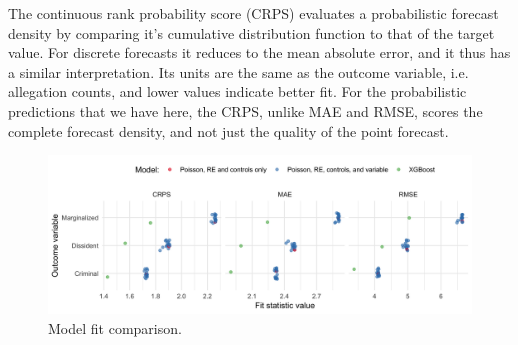 \documentclass[12pt]{article}
\begin{document}
The continuous rank probability score (CRPS) evaluates a probabilistic forecast density by comparing it's cumulative distribution function to that of the target value. For discrete forecasts it reduces to the mean absolute error, and it thus has a similar interpretation. Its units are the same as the outcome variable, i.e. allegation counts, and lower values indicate better fit. For the probabilistic predictions that we have here, the CRPS, unlike MAE and RMSE, scores the complete forecast density, and not just the quality of the point forecast. 

\begin{figure}
\caption{Model fit comparison.}
\includegraphics[width=.9\textwidth]{../output/figures/oos-fit-all.png}
\end{figure}










\end{document}
